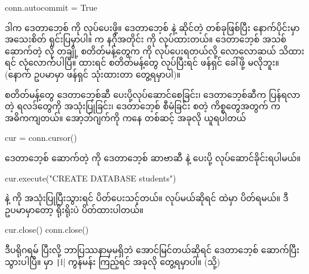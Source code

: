 %
\begin{py}
conn.autocommit = True
\end{py}
%
ဒါက ဒေတာဘေ့စ်   ကို  လုပ်ပေးဖို့။ ဒေတာဘေ့စ်  နဲ့ ဆိုင်တဲ့  တစ်ခုဖြစ်ပြီး နောက်ပိုင်းမှာ အသေးစိတ် ရှင်းပြမှာပါ။  က နဂိုအတိုင်း   ကို  လုပ်ထားတယ်။ ဒေတာဘေ့စ် အသစ်ဆောက်တဲ့  လို တချို့  စတိတ်မန့်တွေက  ကို  လုပ်ပေးရတယ်လို့ လောလောဆယ် သိထားရင် လုံလောက်ပါပြီ။  ထားရင်  စတိတ်မန့်တွေ  လုပ်ပြီးရင်  ဖန်ရှင် ခေါ်ဖို့ မလိုဘူး။ (နောက် ဥပမာမှာ  ဖန်ရှင် သုံးထားတာ တွေ့ရမှာပါ)။

 စတိတ်မန့်တွေ ဒေတာဘေ့စ်ဆီ ပေးပို့လုပ်ဆောင်စေခြင်း၊ ဒေတာဘေ့စ်ဆီက ပြန်ရလာတဲ့ ရလဒ်တွေကို အသုံးပြုခြင်း၊ ဒေတာဘေ့စ်  စီမံခြင်း စတဲ့ ကိစ္စတွေအတွက်  က အဓိကကျတယ်။  အော့ဘ်ဂျက်ကို  ကနေ တစ်ဆင့် အခုလို ယူရပါတယ်
%
\begin{py}
cur = conn.cursor()
\end{py}
%

 ဒေတာဘေ့စ် ဆောက်တဲ့  ကို ဒေတာဘေ့စ် ဆာဗာဆီ  နဲ့ ပေးပို့ လုပ်ဆောင်ခိုင်းရပါမယ်။ 
%
\begin{py}
cur.execute("CREATE DATABASE students")
\end{py}
%

 နဲ့  ကို အသုံးပြုပြီးသွားရင် ပိတ်ပေးသင့်တယ်။  လုပ်မယ်ဆိုရင်  ထဲမှာ ပိတ်ရမယ်။ ဒီဥပမာမှာတော့ ရိုးရိုးပဲ ပိတ်ထားပါတယ်။
%
\begin{py}
cur.close()
conn.close()
\end{py}
%

ဒီပရိုဂရမ်  ပြီးလို့ ဘာပြဿနာမှမရှိဘဲ အောင်မြင်တယ်ဆိုရင်  ဒေတာဘေ့စ် ဆောက်ပြီးသွားပါပြီ။  မှာ \texttt|\l| ကွန်မန်း  ကြည့်ရင် အခုလို တွေ့ရမှာပါ။
(သို့)  


\begin{figure}[tb!]
\caption{}
\label{fig:lstdbstu}
\end{figure}




